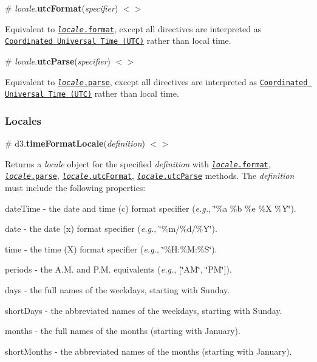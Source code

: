 \label{_locale_utcFormat}%
\# {\itshape locale}.{\bfseries utc\+Format}({\itshape specifier}) \href{https://github.com/d3/d3-time-format/blob/master/src/locale.js#L303}{\tt $<$$>$}

Equivalent to \href{#locale_format}{\tt {\itshape locale}.format}, except all directives are interpreted as \href{https://en.wikipedia.org/wiki/Coordinated_Universal_Time}{\tt Coordinated Universal Time (U\+TC)} rather than local time.

\label{_locale_utcParse}%
\# {\itshape locale}.{\bfseries utc\+Parse}({\itshape specifier}) \href{https://github.com/d3/d3-time-format/blob/master/src/locale.js#L308}{\tt $<$$>$}

Equivalent to \href{#locale_parse}{\tt {\itshape locale}.parse}, except all directives are interpreted as \href{https://en.wikipedia.org/wiki/Coordinated_Universal_Time}{\tt Coordinated Universal Time (U\+TC)} rather than local time.

\subsubsection*{Locales}

\label{_timeFormatLocale}%
\# d3.{\bfseries time\+Format\+Locale}({\itshape definition}) \href{https://github.com/d3/d3-time-format/blob/master/src/locale.js}{\tt $<$$>$}

Returns a {\itshape locale} object for the specified {\itshape definition} with \href{#locale_format}{\tt {\itshape locale}.format}, \href{#locale_parse}{\tt {\itshape locale}.parse}, \href{#locale_utcFormat}{\tt {\itshape locale}.utc\+Format}, \href{#locale_utcParse}{\tt {\itshape locale}.utc\+Parse} methods. The {\itshape definition} must include the following properties\+:


\begin{DoxyItemize}
\item {\ttfamily date\+Time} -\/ the date and time ({\ttfamily c}) format specifier ({\itshape e.\+g.}, {\ttfamily \char`\"{}\%a \%b \%e \%\+X \%\+Y\char`\"{}}).
\item {\ttfamily date} -\/ the date ({\ttfamily x}) format specifier ({\itshape e.\+g.}, {\ttfamily \char`\"{}\%m/\%d/\%\+Y\char`\"{}}).
\item {\ttfamily time} -\/ the time ({\ttfamily X}) format specifier ({\itshape e.\+g.}, {\ttfamily \char`\"{}\%\+H\+:\%\+M\+:\%\+S\char`\"{}}).
\item {\ttfamily periods} -\/ the A.\+M. and P.\+M. equivalents ({\itshape e.\+g.}, {\ttfamily \mbox{[}\char`\"{}\+A\+M\char`\"{}, \char`\"{}\+P\+M\char`\"{}\mbox{]}}).
\item {\ttfamily days} -\/ the full names of the weekdays, starting with Sunday.
\item {\ttfamily short\+Days} -\/ the abbreviated names of the weekdays, starting with Sunday.
\item {\ttfamily months} -\/ the full names of the months (starting with January).
\item {\ttfamily short\+Months} -\/ the abbreviated names of the months (starting with January).
\end{DoxyItemize}


